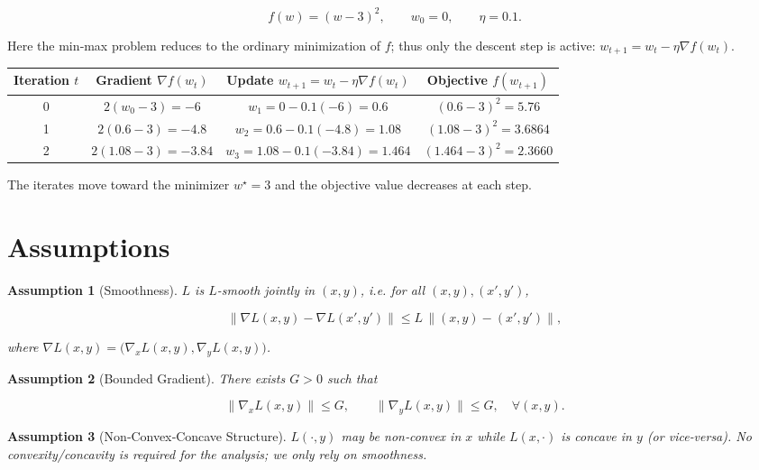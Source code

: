 \documentclass{article}
\newtheorem{assumption}{Assumption}
\begin{document}
\[
f(w)=(w-3)^{2},\qquad w_{0}=0,\qquad \eta=0.1 .
\]

Here the min‑max problem reduces to the ordinary minimization of \(f\); thus only the descent step is active:
\(w_{t+1}=w_{t}-\eta\nabla f(w_{t})\).

\begin{center}
\begin{tabular}{c|c|c|c}
Iteration $t$ & Gradient $\nabla f(w_t)$ & Update $w_{t+1}=w_t-\eta\nabla f(w_t)$ & Objective $f(w_{t+1})$\\ \hline
0 & $2(w_0-3)= -6$ & $w_{1}=0-0.1(-6)=0.6$ & $(0.6-3)^2=5.76$\\[2mm]
1 & $2(0.6-3)= -4.8$ & $w_{2}=0.6-0.1(-4.8)=1.08$ & $(1.08-3)^2=3.6864$\\[2mm]
2 & $2(1.08-3)= -3.84$ & $w_{3}=1.08-0.1(-3.84)=1.464$ & $(1.464-3)^2=2.3660$\\
\end{tabular}
\end{center}
The iterates move toward the minimizer \(w^{\star}=3\) and the objective value decreases at each step.

\newpage
\section*{Assumptions}
\begin{assumption}[Smoothness]\label{ass:smooth}
\(L\) is \(L\)-smooth jointly in \((x,y)\), i.e. for all \((x,y),(x',y')\),

\[
\big\|\nabla L(x,y)-\nabla L(x',y')\big\| \le L\,
\big\|(x,y)-(x',y')\big\|,
\tag{2}
\]

where \(\nabla L(x,y)=\big(\nabla_x L(x,y),\nabla_y L(x,y)\big)\).
\end{assumption}

\begin{assumption}[Bounded Gradient]\label{ass:bound}
There exists \(G>0\) such that  

\[
\|\nabla_x L(x,y)\|\le G,\qquad \|\nabla_y L(x,y)\|\le G,
\quad\forall (x,y).
\tag{3}
\]

\end{assumption}

\begin{assumption}[Non‑Convex‑Concave Structure]\label{ass:nc}
\(L(\cdot ,y)\) may be non‑convex in \(x\) while \(L(x,\cdot )\) is concave in \(y\) (or vice‑versa). No convexity/concavity is required for the analysis; we only rely on smoothness.
\end{assumption}
\end{document}
